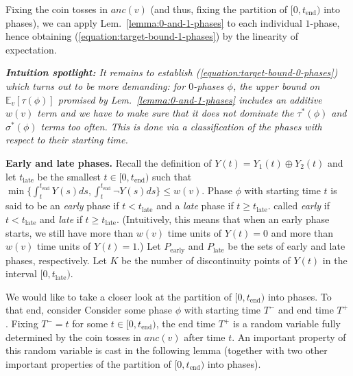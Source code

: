 \documentclass[11pt]{article}
\def\LongVersion{}
\def\LongVersionEnd{}
\def\ShortVersion{}
\def\ShortVersionEnd{}
\renewcommand{\paragraph}[1]{\par\noindent\textbf{#1}}
\theoremstyle{definition}
\theoremstyle{plain}
\theoremstyle{definition}
\theoremstyle{plain}
\theoremstyle{definition}
\theoremstyle{plain}
\newenvironment{IntuitionSpotlight}[0]
{\par%
\setlength{\leftskip}{0.5\parindent}%
\setlength{\rightskip}{0.5\parindent}%
\noindent\itshape\textbf{Intuition spotlight:}}
{\par\ignorespacesafterend}
\newcommand{\NotationLabel}[1]{\label{notationTable:#1}\ignorespaces}
\newcommand{\Lem}{Lem.}
\newcommand{\Expect}{\mathbb{E}}
\newcommand{\Ancestors}{\mathit{anc}}
\newcommand{\EndTime}{\mathit{t}_{\mathrm{end}}}
\newcommand{\LateTime}{\mathit{t}_{\mathrm{late}}}
\newcommand{\adv}[1]{{#1}^{*}}
\newcommand*{\xor}{\mathbin{\oplus}}
\begin{document}
Fixing the coin tosses in $\Ancestors(v)$ (and thus, fixing the partition of
$[0, \EndTime)$ into phases), we can apply \Lem{}~\ref{lemma:0-and-1-phases}
to each individual $1$-phase, hence obtaining
(\ref{equation:target-bound-1-phases}) by the linearity of expectation.

\begin{IntuitionSpotlight}
It remains to establish (\ref{equation:target-bound-0-phases}) which turns out
to be more demanding:
for $0$-phases $\phi$, the upper bound on $\Expect_{v}[\tau(\phi)]$ promised by
\Lem{}~\ref{lemma:0-and-1-phases} includes an additive $w(v)$ term and we have
to make sure that it does not dominate the $\adv{\tau}(\phi)$ and
$\adv{\sigma}(\phi)$ terms too often.
This is done via a classification of the phases with respect to
their starting time.
\end{IntuitionSpotlight}

\paragraph{Early and late phases.}
Recall the definition of
$Y(t) = Y_{1}(t) \xor Y_{2}(t)$
and let $\LateTime$ be the smallest
$t \in [0, \EndTime)$
such that
$\min \{ \int_{t}^{\EndTime} Y(s) d s,  \int_{t}^{\EndTime} \neg Y(s) d s \}
\leq w(v)$.
\NotationLabel{analysis:late-time}
Phase $\phi$ with starting time $t$ is
\LongVersion %
said to be an \emph{early}
phase if
$t < \LateTime$
and a \emph{late} phase if
$t \geq \LateTime$.
\LongVersionEnd %
%
\ShortVersion %
called \emph{early} if
$t < \LateTime$
and \emph{late} if
$t \geq \LateTime$.
\ShortVersionEnd %
(Intuitively, this means that when an early phase starts, we still have more
than $w(v)$ time units of
$Y(t) = 0$
and more than $w(v)$ time units of
$Y(t) = 1$.)
Let
$P_{\mathrm{early}}$
\NotationLabel{analysis:P-early}
and
$P_{\mathrm{late}}$
\NotationLabel{analysis:P-late}
be the sets of early and late phases, respectively.
Let
$K$
\NotationLabel{analysis:K}
be the number of discontinuity points of $Y(t)$ in the interval
$[0, \LateTime)$.

We would like to take a closer look at the partition of $[0, \EndTime)$ into
phases.
\LongVersion %
To that end, consider
\LongVersionEnd %
%
\ShortVersion %
Consider
\ShortVersionEnd %
some phase $\phi$ with starting time $T^{-}$ and end
time $T^{+}$.
Fixing
$T^{-} = t$
for some
$t \in [0, \EndTime)$,
the end time $T^{+}$ is a random variable fully determined by the coin tosses
in $\Ancestors(v)$ after time $t$.
\LongVersion %
An important property of this random variable is cast in the following lemma
(together with
two other important properties of the partition of $[0, \EndTime)$ into
phases).
\LongVersionEnd %
\end{document}

